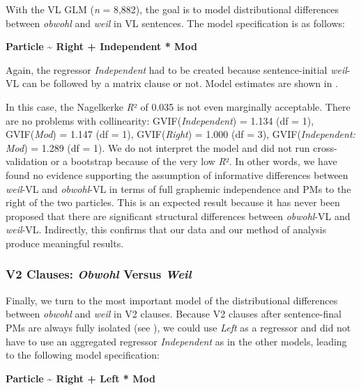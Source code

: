 With the VL GLM (\textit{n} = 8,882), the goal is to model distributional differences between \textit{obwohl} and \textit{weil} in VL sentences. The model specification is as follows:



\textbf{Particle} \textbf{{\textasciitilde} Right + Independent * Mod}



Again, the regressor \textit{Independent} had to be created because sentence-initial \textit{weil}{}-VL can be followed by a matrix clause or not. Model estimates are shown in .



In this case, the Nagelkerke \textit{R}² of 0.035 is not even marginally acceptable. There are no problems with collinearity: GVIF(\textit{Independent}) = 1.134 (df = 1), GVIF(\textit{Mod}) = 1.147 (df = 1), GVIF(\textit{Right}) = 1.000 (df = 3), GVIF(\textit{Independent:} \textit{Mod}) = 1.289 (df = 1). We do not interpret the model and did not run cross-validation or a bootstrap because of the very low \textit{R}². In other words, we have found no evidence supporting the assumption of informative differences between \textit{weil}{}-VL and \textit{obwohl}{}-VL in terms of full graphemic independence and PMs to the right of the two particles. This is an expected result because it has never been proposed that there are significant structural differences between \textit{obwohl}{}-VL and \textit{weil}{}-VL. Indirectly, this confirms that our data and our method of analysis produce meaningful results.



\subsubsection{V2 Clauses: \textit{Obwohl} Versus \textit{Weil}}



Finally, we turn to the most important model of the distributional differences between \textit{obwohl} and \textit{weil} in V2 clauses. Because V2 clauses after sentence-final PMs are always fully isolated (see ), we could use \textit{Left} as a regressor and did not have to use an aggregated regressor \textit{Independent} as in the other models, leading to the following model specification:



\textbf{Particle} \textbf{{\textasciitilde} Right + Left * Mod}



